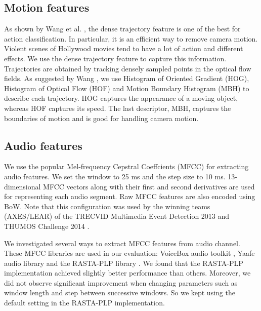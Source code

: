 \subsection{Motion features}
As shown by Wang et al. \cite{wang2013action}, the dense trajectory feature is one of the best for action classification. In particular, it is an efficient way to remove camera motion. Violent scenes of Hollywood movies tend to have a lot of action and different effects. We use the dense trajectory feature to capture this information. Trajectories are obtained by tracking densely sampled points in the optical flow fields. As suggested by Wang \cite{wang2013action}, we use Histogram of Oriented Gradient (HOG), Histogram of Optical Flow (HOF) and Motion Boundary Histogram (MBH) to describe each trajectory. HOG captures the appearance of a moving object, whereas HOF captures its speed. The last descriptor, MBH, captures the boundaries of motion and is good for handling camera motion.


\subsection{Audio features}
We use the popular Mel-frequency Cepstral Coeffcients (MFCC) \cite{rabiner2007introduction} for extracting audio features. We set the window to 25 ms and the step size to 10 ms. 13-dimensional MFCC vectors along with their first and second derivatives are used for representing each audio segment. Raw MFCC features are also encoded using BoW. Note that this configuration was used by the winning teams (AXES/LEAR) of the TRECVID Multimedia Event Detection 2013 \cite{aly2013axes} and THUMOS Challenge 2014 \cite{oneata2014lear}.

We investigated several ways to extract MFCC features from audio channel. These MFCC libraries are used in our evaluation: VoiceBox audio toolkit \cite{voicebox}, Yaafe audio library \cite{mathieu2010yaafe} and the RASTA-PLP library \cite{Ellis05-rastamat}. We found that the RASTA-PLP implementation achieved slightly better performance than others. Moreover, we did not observe significant improvement when changing parameters such as window length and step between successive windows. So we kept using the default setting in the RASTA-PLP implementation.

